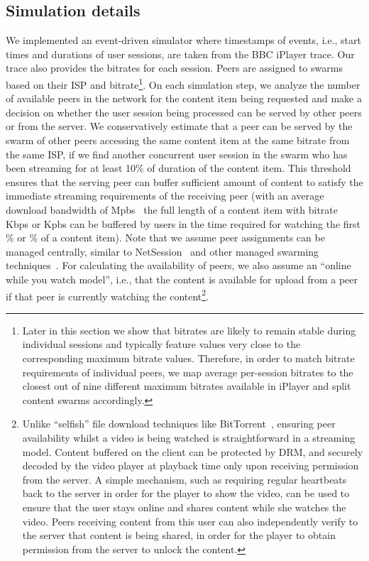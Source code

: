 \documentclass[10pt, conference, letterpaper]{IEEEtran}
\begin{document}
\subsection{Simulation details}
We implemented an event-driven simulator where timestamps of events, i.e., start times and durations of user sessions, are taken from the BBC iPlayer trace. Our trace also provides the bitrates for each session. Peers are assigned to swarms based on their ISP and bitrate\footnote{Later in this section we show that bitrates are likely to remain stable during individual sessions and typically feature values very close to the corresponding maximum bitrate values. Therefore, in order to match bitrate requirements of individual peers, we map average per-session bitrates to the closest out of nine different maximum bitrates available in iPlayer and split content swarms accordingly.}. On each simulation step, we analyze the number of available peers in the network for the content item being requested and make a decision on whether the user session being processed can be served by other peers or from the server. We conservatively estimate that a peer can be served by the swarm of other peers accessing the same content item at the same bitrate from the same ISP, if we find another concurrent user session in the swarm who has been streaming for at least 10\% of duration of the content item. This threshold ensures that the serving peer can buffer sufficient amount of content to satisfy the immediate streaming requirements of the receiving peer (with an average download bandwidth of  Mpbs~\cite{ofcom2014speed} the full length of a content item with bitrate  Kbps or  Kpbs can be buffered by users in the time required for watching the first \% or \% of a content item). 
Note that we assume peer assignments can be managed centrally, similar to NetSession~\cite{zhao2013peer} and other managed swarming techniques~\cite{peterson2009antfarm}. For calculating the availability of peers, we also assume an ``online while you watch model'', i.e., that the content is available for upload from a peer if that peer is currently watching the content\footnote{Unlike ``selfish'' file download techniques like BitTorrent~\cite{cohen2008bittorrent}, ensuring peer availability whilst a video is being watched is straightforward in a streaming  model. 
Content buffered on the client can be protected by DRM, and securely decoded by the video player at playback time only upon receiving permission from the server. A simple mechanism, such as requiring regular heartbeats back to the server in order for the player to show the video, can be used to ensure that the user stays online and shares content while she watches the video. Peers receiving content from this user can also independently verify to the server that content is being shared, in order for the player to obtain permission from the server to unlock the content.}. 
\end{document}
